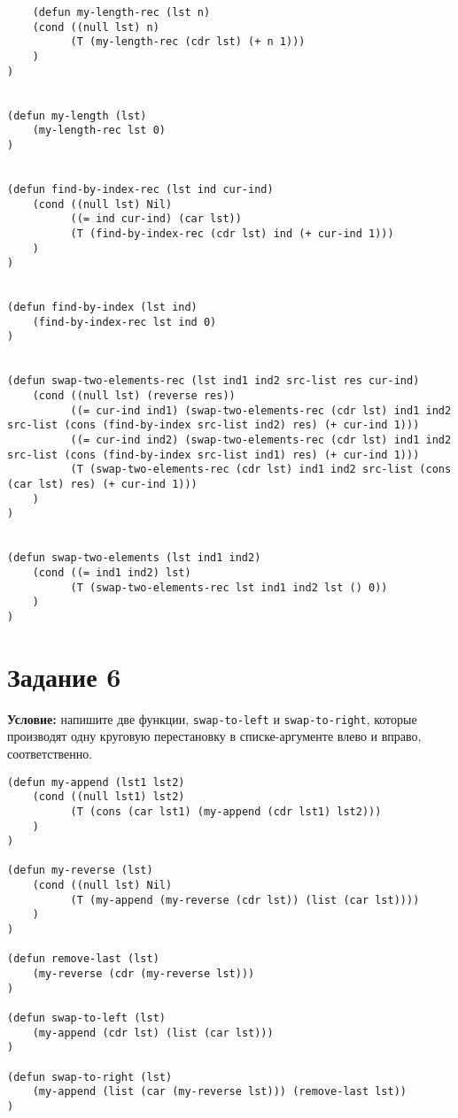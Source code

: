 \begin{lstlisting}
    (defun my-length-rec (lst n)
    (cond ((null lst) n)
          (T (my-length-rec (cdr lst) (+ n 1)))
    )
)


(defun my-length (lst)
    (my-length-rec lst 0)
)


(defun find-by-index-rec (lst ind cur-ind)
    (cond ((null lst) Nil)
          ((= ind cur-ind) (car lst))
          (T (find-by-index-rec (cdr lst) ind (+ cur-ind 1)))
    )
)


(defun find-by-index (lst ind)
    (find-by-index-rec lst ind 0)
)


(defun swap-two-elements-rec (lst ind1 ind2 src-list res cur-ind)
    (cond ((null lst) (reverse res))
          ((= cur-ind ind1) (swap-two-elements-rec (cdr lst) ind1 ind2 src-list (cons (find-by-index src-list ind2) res) (+ cur-ind 1)))
          ((= cur-ind ind2) (swap-two-elements-rec (cdr lst) ind1 ind2 src-list (cons (find-by-index src-list ind1) res) (+ cur-ind 1)))
          (T (swap-two-elements-rec (cdr lst) ind1 ind2 src-list (cons (car lst) res) (+ cur-ind 1)))    
    )
)


(defun swap-two-elements (lst ind1 ind2)
    (cond ((= ind1 ind2) lst)
          (T (swap-two-elements-rec lst ind1 ind2 lst () 0))
    )
)
\end{lstlisting}


\section{Задание 6}

\textbf{Условие:} напишите две функции, \texttt{swap-to-left} и \texttt{swap-to-right}, которые производят одну круговую перестановку в списке-аргументе влево и вправо, соответственно.

\begin{lstlisting}
(defun my-append (lst1 lst2)
    (cond ((null lst1) lst2)
          (T (cons (car lst1) (my-append (cdr lst1) lst2)))
    )
)

(defun my-reverse (lst)
    (cond ((null lst) Nil)
          (T (my-append (my-reverse (cdr lst)) (list (car lst))))
    )
)

(defun remove-last (lst)
    (my-reverse (cdr (my-reverse lst)))
)

(defun swap-to-left (lst)
    (my-append (cdr lst) (list (car lst)))
)

(defun swap-to-right (lst)
    (my-append (list (car (my-reverse lst))) (remove-last lst))
)
\end{lstlisting}


